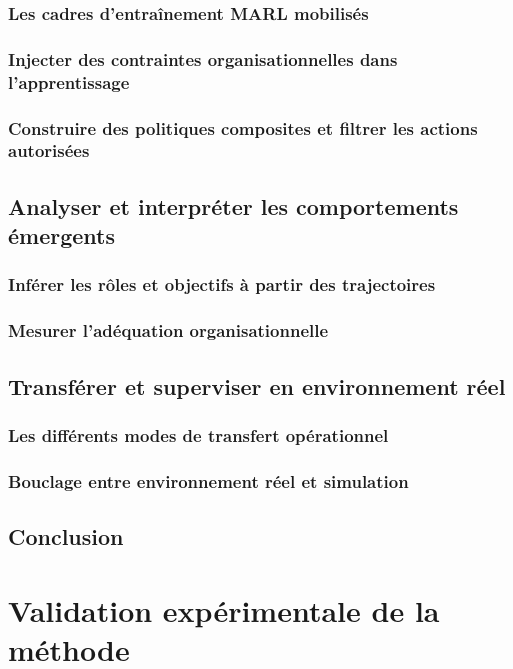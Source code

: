 \documentclass[ twoside,openright,titlepage,numbers=noenddot,headinclude,%
                footinclude=true,cleardoublepage=empty,abstractoff, %
                BCOR=5mm,paper=a4,fontsize=11pt,%
                french,american,%
                ]{scrreprt}
\begin{document}
\section{Les cadres d'entraînement MARL mobilisés}
\section{Injecter des contraintes organisationnelles dans l'apprentissage}
\section{Construire des politiques composites et filtrer les actions autorisées}

\chapter{Analyser et interpréter les comportements émergents}
\section{Inférer les rôles et objectifs à partir des trajectoires}
\section{Mesurer l'adéquation organisationnelle}

\chapter{Transférer et superviser en environnement réel}
\section{Les différents modes de transfert opérationnel}
\section{Bouclage entre environnement réel et simulation}

\chapter*{Conclusion}


\part{Validation expérimentale de la méthode}
\end{document}
